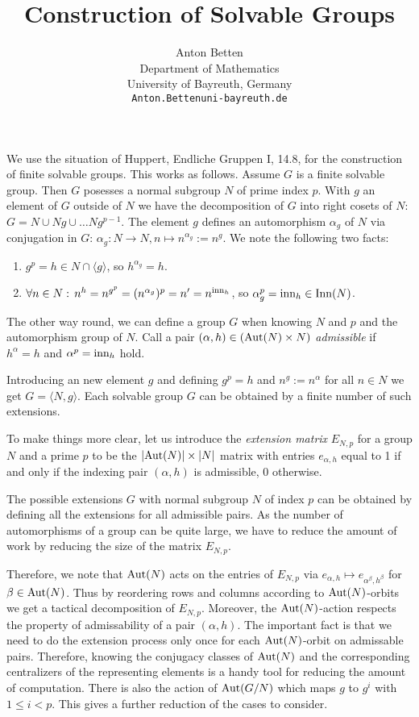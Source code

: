 \documentclass[]{article}
\title{Construction of Solvable Groups}
\author{{\sc Anton Betten}\\
Department of Mathematics\\
University of Bayreuth, Germany\\
{\tt Anton.Betten\symbol{64}uni-bayreuth.de}}
\date{}
\begin{document}
\pagestyle{empty}
\thispagestyle{empty}

\maketitle

We use the situation of {\sc Huppert}, Endliche Gruppen I, 14.8, 
for the construction of finite solvable groups. 
This works as follows. Assume $G$ is a finite solvable group. 
Then $G$ posesses a normal subgroup $N$ of prime index $p$. 
With $g$ an element of $G$ outside of $N$ we have the decomposition 
of $G$ into right cosets of $N$: 
$G = N \cup Ng \cup \ldots  Ng^{p-1}$. 
The element $g$ defines an automorphism $\alpha_g$ of $N$ 
via conjugation in $G$: 
$\alpha_g: N \rightarrow N, n \mapsto n^{\alpha_g} := n^g$. 
We note the following two facts: 
\begin{enumerate}
\item
$g^p = h \in N \cap \langle g \rangle$, so $h^{\alpha_g} = h$. 
\item
$\forall n \in N:  \, n^h = n^{g^p} = (n^{\alpha_g})^p = n' = n^{{\rm inn}_h}$, 
so $\alpha_g^p = {\rm inn}_h \in {\rm Inn}(N)$. 
\end {enumerate}
The other way round, 
we can define a group $G$ when knowing $N$ and $p$ 
and the automorphism group of $N$. 
Call a pair $(\alpha, h) \in ({\rm Aut}(N) \times N)$ 
{\em admissible} if 
$h^\alpha = h$ and $\alpha^p = {\rm inn}_h$ hold.

Introducing an new element $g$ and defining $g^p = h$ and 
$n^g := n^\alpha$ for all $n \in N$ we get $G = \langle N, g \rangle$. 
Each solvable group $G$ can be obtained by a finite number of such 
extensions. 

To make things more clear, let us introduce the {\em extension matrix} 
$E_{N,p}$ for a group $N$ and a prime $p$ to be the 
$|{\rm Aut}(N)| \times |N|$ matrix 
with entries $e_{\alpha,h}$ equal to 1 if and only if the 
indexing pair $(\alpha,h)$ is admissible, 0 otherwise. 

The possible extensions $G$ with normal subgroup $N$ of index $p$ 
can be obtained by defining all the extensions for all 
admissible pairs. 
As the number of automorphisms of a group can be quite large, 
we have to reduce the amount of work by reducing the 
size of the matrix $E_{N,p}$. 

Therefore, we note that ${\rm Aut}(N)$ acts on the entries of 
$E_{N,p}$  via 
$e_{\alpha,h} \mapsto e_{\alpha^\beta, h^\beta}$ for 
$\beta \in {\rm Aut}(N)$.
Thus by reordering rows and columns according to 
${\rm Aut}(N)$-orbits  we get a tactical decomposition of $E_{N,p}$. 
Moreover, the ${\rm Aut}(N)$-action respects the property of admissability 
of a pair $(\alpha,h)$.
The important fact is that we need to do the extension process 
only once for each ${\rm Aut}(N)$-orbit on admissable pairs. 
Therefore, knowing the conjugacy classes of ${\rm Aut}(N)$ 
and the corresponding centralizers of the representing elements 
is a handy tool for reducing the amount of computation. 
There is also the action of ${\rm Aut}(G/N)$ which maps  
$g$ to $g^i$ with $1 \le i < p$. 
This gives a further reduction of the cases to consider. 
\end{document}
